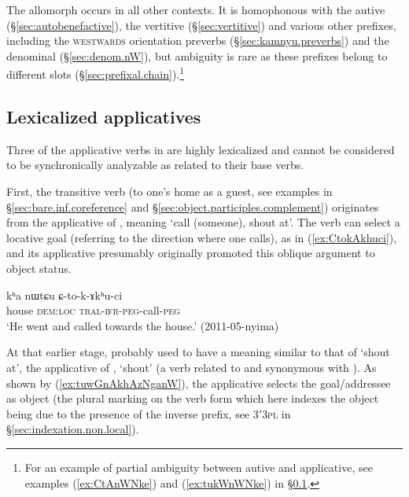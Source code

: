 The allomorph  occurs in all other contexts. It is homophonous with the autive (§\ref{sec:autobenefactive}), the vertitive (§\ref{sec:vertitive}) and various other prefixes, including the \textsc{westwards} orientation preverbs (§\ref{sec:kamnyu.preverbs}) and the denominal  (§\ref{sec:denom.nW}), but ambiguity is rare as these prefixes belong to different slots (§\ref{sec:prefixal.chain}).\footnote{For an example of partial ambiguity between autive and applicative, see examples (\ref{ex:CtAnWNke}) and (\ref{ex:tukWnWNke}) in §\ref{sec:applicative.lexicalized}. } 


\subsection{Lexicalized applicatives} \label{sec:applicative.lexicalized} 
Three of the applicative verbs in  are highly lexicalized and cannot be considered to be synchronically analyzable as related to their base verbs.
 
First, the transitive verb  (to one's home as a guest, see examples in §\ref{sec:bare.inf.coreference} and §\ref{sec:object.participles.complement}) originates from the applicative  of , meaning `call (someone), shout at'. The verb  can select a locative goal (referring to the direction where one calls), as in (\ref{ex:CtokAkhuci}), and its applicative  presumably originally promoted this oblique argument to object status.

\begin{exe}
\ex \label{ex:CtokAkhuci}
\gll kʰa nɯtɕu ɕ-to-k-ɤkʰu-ci \\
house \textsc{dem}:\textsc{loc} \textsc{tral}-\textsc{ifr}-\textsc{peg}-call-\textsc{peg} \\
\glt `He went and called towards the house.' (2011-05-nyima)
\end{exe}

At that earlier stage,  probably used to have a meaning similar to that of  `shout at', the applicative of , `shout' (a verb related to and synonymous with ). As shown by (\ref{ex:tuwGnAkhAzNganW}), the applicative  selects the goal/addressee as object (the plural marking on the verb form which here indexes the object being due to the presence of the inverse prefix, see 3$'$\fl{}\textsc{3pl} in §\ref{sec:indexation.non.local}). 

